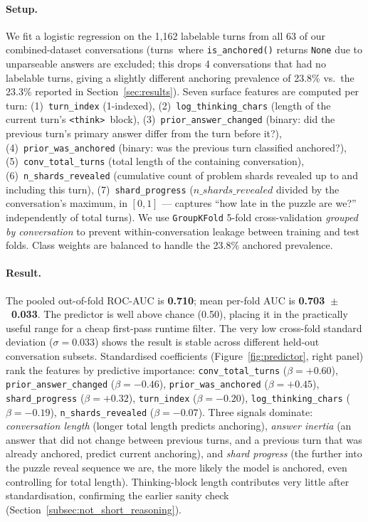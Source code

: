 \documentclass{article}
\begin{document}
\paragraph{Setup.}
We fit a logistic regression on the 1{,}162 labelable turns
from all 63 of our combined-dataset conversations
(turns~where \texttt{is\_anchored()} returns \texttt{None} due to
unparseable answers are excluded; this drops 4 conversations
that had no labelable turns, giving a slightly different anchoring
prevalence of 23.8\% vs.\ the 23.3\% reported in Section~\ref{sec:results}).
Seven surface features are computed per turn:
(1)~\texttt{turn\_index} (1-indexed),
(2)~\texttt{log\_thinking\_chars} (length of the current turn's
\texttt{<think>}~block),
(3)~\texttt{prior\_answer\_changed} (binary: did the previous turn's
primary answer differ from the turn before it?),
(4)~\texttt{prior\_was\_anchored} (binary: was the previous turn
classified anchored?),
(5)~\texttt{conv\_total\_turns} (total length of the containing
conversation),
(6)~\texttt{n\_shards\_revealed} (cumulative count of problem
shards revealed up to and including this turn),
(7)~\texttt{shard\_progress} ($n\_shards\_revealed$ divided by
the conversation's maximum, in $[0,1]$ --- captures
``how late in the puzzle are we?'' independently of total turns).
We use \texttt{GroupKFold} 5-fold cross-validation \emph{grouped by
conversation} to prevent within-conversation leakage between
training and test folds.
Class weights are balanced to handle the 23.8\% anchored prevalence.

\paragraph{Result.}
The pooled out-of-fold ROC-AUC is \textbf{0.710}; mean per-fold AUC
is \textbf{0.703~$\pm$~0.033}.
The predictor is well above chance (0.50), placing it in the
practically useful range for a cheap first-pass runtime filter.
The very low cross-fold standard deviation ($\sigma=0.033$) shows
the result is stable across different held-out conversation subsets.
Standardised coefficients (Figure~\ref{fig:predictor}, right panel) rank
the features by predictive importance:
\texttt{conv\_total\_turns} ($\beta=+0.60$),
\texttt{prior\_answer\_changed} ($\beta=-0.46$),
\texttt{prior\_was\_anchored} ($\beta=+0.45$),
\texttt{shard\_progress} ($\beta=+0.32$),
\texttt{turn\_index} ($\beta=-0.20$),
\texttt{log\_thinking\_chars} ($\beta=-0.19$),
\texttt{n\_shards\_revealed} ($\beta=-0.07$).
Three signals dominate: \emph{conversation length} (longer total
length predicts anchoring), \emph{answer inertia} (an answer that
did not change between previous turns, and a previous turn that
was already anchored, predict current anchoring), and
\emph{shard progress} (the further into the puzzle reveal sequence
we are, the more likely the model is anchored, even controlling
for total length).
Thinking-block length contributes very little after standardisation,
confirming the earlier sanity check (Section~\ref{subsec:not_short_reasoning}).
\end{document}
